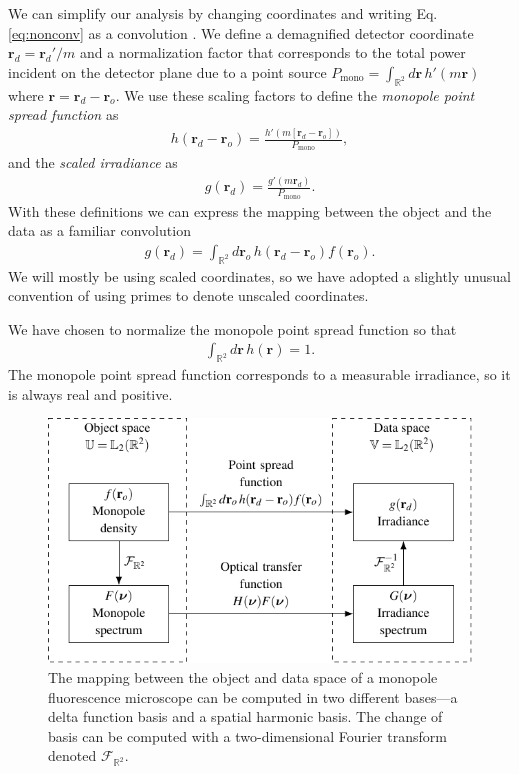 \documentclass[]{osa-article}
\providecommand{\mb}[1]{\mathbf{#1}}
\providecommand{\ro}{\mathbf{\mathbf{r}}_o}
\providecommand{\rd}{\mathbf{r}_d}
\providecommand{\mbb}[1]{\mathbb{#1}}
\begin{document}
We can simplify our analysis by changing coordinates and writing Eq.
\ref{eq:nonconv} as a convolution \cite{barrett2004}. We define a demagnified
detector coordinate $\rd = \rd'/m$ and a normalization factor that corresponds
to the total power incident on the detector plane due to a point source
$P_{\text{mono}} = \int_{\mbb{R}^2}d\mb{r}\,h'(m\mb{r})$ where
$\mb{r} = \rd - \ro$. We use these scaling factors to define the
\textit{monopole point spread function} as
\begin{align}
  h(\rd - \ro) = \frac{h'(m[\rd - \ro])}{P_{\text{mono}}},
\end{align}
and the \textit{scaled irradiance} as
\begin{align}
  g(\rd) = \frac{g'(m\rd)}{P_{\text{mono}}}.
\end{align}
With these definitions we can express the mapping between the object and the
data as a familiar convolution
\begin{align}
  g(\rd) = \int_{\mbb{R}^2}d\ro\, h(\rd - \ro)f(\ro).  \label{eq:lsi}
\end{align}
We will mostly be using scaled coordinates, so we have adopted a slightly
unusual convention of using primes to denote unscaled coordinates.

We have chosen to normalize the monopole point spread function so that
\begin{align}
  \int_{\mbb{R}^2}d\mb{r}\, h(\mb{r}) = 1. \label{eq:norm}
\end{align}
The monopole point spread function corresponds to a measurable irradiance, so it
is always real and positive.

\begin{figure}
  \centering
  \includegraphics[scale=1.0]{../figures/monopole-block/monopole-block.pdf}
  \caption{The mapping between the object and data space of a monopole
    fluorescence microscope can be computed in two different bases---a delta
    function basis and a spatial harmonic basis. The change of basis can be
    computed with a two-dimensional Fourier transform denoted
    $\mathcal{F}_{\mbb{R}^2}$.}
     \label{fig:monopole-block}      
\end{figure}
\end{document}
